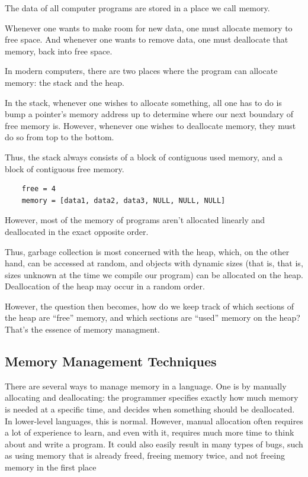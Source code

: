 \documentclass[index]{subfiles}
\begin{document}
The data of all computer programs are stored in a place we call memory.

Whenever one wants to make room for new data, one must allocate memory to free space. And whenever one wants to remove data, one must deallocate that memory, back into free space.

In modern computers, there are two places where the program can allocate memory: the stack and the heap.

In the stack, whenever one wishes to allocate something, all one has to do is bump a pointer's memory address up to determine where our next boundary of free memory is\cite[Chapter~4.1~What~is~Ownership?]{the_rust_programming_language}. However, whenever one wishes to deallocate memory, they must do so from top to the bottom.

Thus, the stack always consists of a block of contiguous used memory, and a block of contiguous free memory.

\begin{verbatim}
    free = 4
    memory = [data1, data2, data3, NULL, NULL, NULL]
\end{verbatim}

However, most of the memory of programs aren't allocated linearly and deallocated in the exact opposite order.

Thus, garbage collection is most concerned with the heap, which, on the other hand, can be accessed at random, and objects with dynamic sizes (that is, that is, sizes unknown at the time we compile our program) can be allocated on the heap. Deallocation of the heap may occur in a random order.

However, the question then becomes, how do we keep track of which sections of the heap are ``free'' memory, and which sections are ``used'' memory on the heap? That's the essence of memory managment.

\subsection{Memory Management Techniques}

There are several ways to manage memory in a language. One is by manually allocating and deallocating: the programmer specifies exactly how much memory is needed at a specific time, and decides when something should be deallocated. In lower-level languages, this is normal. However, manual allocation often requires a lot of experience to learn, and even with it, requires much more time to think about and write a program. It could also easily result in many types of bugs, such as using memory that is already freed, freeing memory twice, and not freeing memory in the first place \cites{garbage_collection_overview_uw}[Chapter~1]{gc_handbook}
\end{document}
